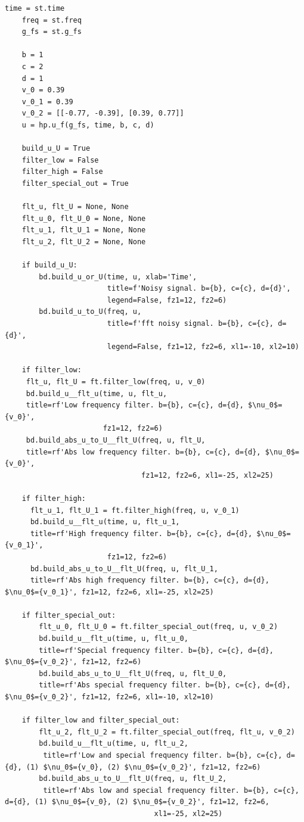 \documentclass[a4paper, 12pt]{article}
\begin{document}
    \begin{lstlisting}[label=l7, caption={Файл nospec.py. Фильтрация специфических частот.}]
    time = st.time
    freq = st.freq
    g_fs = st.g_fs
        
    b = 1
    c = 2
    d = 1
    v_0 = 0.39
    v_0_1 = 0.39
    v_0_2 = [[-0.77, -0.39], [0.39, 0.77]]
    u = hp.u_f(g_fs, time, b, c, d)
        
    build_u_U = True
    filter_low = False
    filter_high = False
    filter_special_out = True
        
    flt_u, flt_U = None, None
    flt_u_0, flt_U_0 = None, None
    flt_u_1, flt_U_1 = None, None
    flt_u_2, flt_U_2 = None, None
        
    if build_u_U:
        bd.build_u_or_U(time, u, xlab='Time',
                        title=f'Noisy signal. b={b}, c={c}, d={d}',
                        legend=False, fz1=12, fz2=6)
        bd.build_u_to_U(freq, u,
                        title=f'fft noisy signal. b={b}, c={c}, d={d}',
                        legend=False, fz1=12, fz2=6, xl1=-10, xl2=10)
        
    if filter_low:
     flt_u, flt_U = ft.filter_low(freq, u, v_0)
     bd.build_u__flt_u(time, u, flt_u,
     title=rf'Low frequency filter. b={b}, c={c}, d={d}, $\nu_0$={v_0}',
                       fz1=12, fz2=6)
     bd.build_abs_u_to_U__flt_U(freq, u, flt_U,
     title=rf'Abs low frequency filter. b={b}, c={c}, d={d}, $\nu_0$={v_0}',
                                fz1=12, fz2=6, xl1=-25, xl2=25)
        
    if filter_high:
      flt_u_1, flt_U_1 = ft.filter_high(freq, u, v_0_1)
      bd.build_u__flt_u(time, u, flt_u_1,
      title=rf'High frequency filter. b={b}, c={c}, d={d}, $\nu_0$={v_0_1}',
                        fz1=12, fz2=6)
      bd.build_abs_u_to_U__flt_U(freq, u, flt_U_1,
      title=rf'Abs high frequency filter. b={b}, c={c}, d={d}, $\nu_0$={v_0_1}', fz1=12, fz2=6, xl1=-25, xl2=25)
        
    if filter_special_out:
        flt_u_0, flt_U_0 = ft.filter_special_out(freq, u, v_0_2)
        bd.build_u__flt_u(time, u, flt_u_0,
        title=rf'Special frequency filter. b={b}, c={c}, d={d}, $\nu_0$={v_0_2}', fz1=12, fz2=6)
        bd.build_abs_u_to_U__flt_U(freq, u, flt_U_0,
        title=rf'Abs special frequency filter. b={b}, c={c}, d={d}, $\nu_0$={v_0_2}', fz1=12, fz2=6, xl1=-10, xl2=10)
        
    if filter_low and filter_special_out:
        flt_u_2, flt_U_2 = ft.filter_special_out(freq, flt_u, v_0_2)
        bd.build_u__flt_u(time, u, flt_u_2,
         title=rf'Low and special frequency filter. b={b}, c={c}, d={d}, (1) $\nu_0$={v_0}, (2) $\nu_0$={v_0_2}', fz1=12, fz2=6)
        bd.build_abs_u_to_U__flt_U(freq, u, flt_U_2,
         title=rf'Abs low and special frequency filter. b={b}, c={c}, d={d}, (1) $\nu_0$={v_0}, (2) $\nu_0$={v_0_2}', fz1=12, fz2=6,
                                   xl1=-25, xl2=25)
        

\end{lstlisting}
\end{document}
